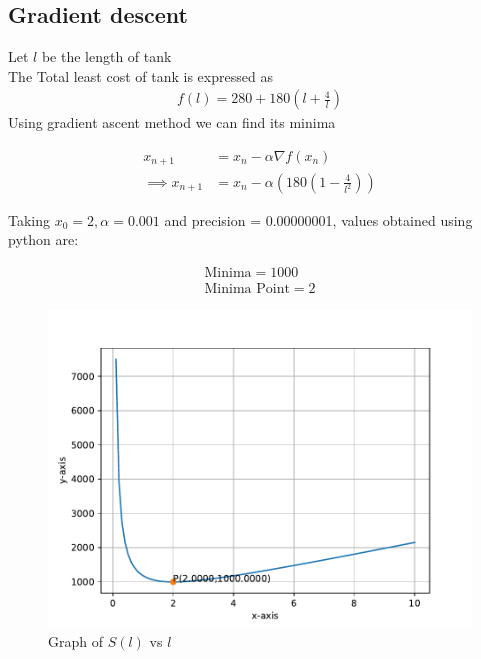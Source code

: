 \documentclass[journal,10pt,twocolumn]{article}
\providecommand{\brak}[1]{\ensuremath{\left(#1\right)}}
\begin{document}
\subsection*{\normalsize Gradient descent}
Let $l$ be the length of tank \\ \vspace{1mm}
The Total least cost of tank is expressed as
\begin{align}
	\label{eq:vol_varx}
	f(l) = 280 + 180\brak{l+\frac{4}{l}}
\end{align}
Using gradient ascent method we can find its minima\\ \vspace{2mm}

    \begin{align}
        x_{n+1} &= x_n - \alpha \nabla f(x_n) \\
        \implies x_{n+1} &= x_n - \alpha \brak{180\brak{1-\frac{4}{l^2}}}
    \end{align}
    
Taking $x_0=2,\alpha=0.001$ and precision = 0.00000001, values obtained using python are:
    
    \begin{align}
        \boxed{\text{Minima} = 1000}\\
        \boxed{\text{Minima Point} = 2}
    \end{align}

\begin{figure}[t]
	\centering
	\includegraphics[width=1\columnwidth]{opt.pdf}
	\caption{Graph of $S(l)$ vs $l$}
	\label{fig:graph_fx}
\end{figure}
\end{document}
